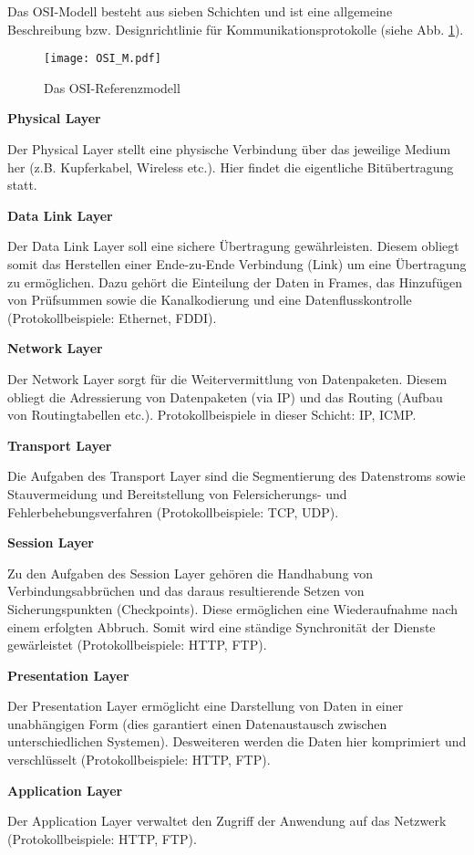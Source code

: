 Das OSI-Modell besteht aus sieben Schichten und ist eine allgemeine Beschreibung
bzw. Designrichtlinie f{\"u}r Kommunikationsprotokolle (siehe Abb.
\ref{fig:OSI_M}).

\begin{figure}[H]
\centering
\texttt{[image: OSI\_M.pdf]}
\caption{Das OSI-Referenzmodell}
\label{fig:OSI_M}
\end{figure}

\textbf{Physical Layer}

Der Physical Layer stellt eine physische Verbindung {\"u}ber das jeweilige
Medium her (z.B. Kupferkabel, Wireless etc.). Hier findet die eigentliche
Bit{\"u}bertragung statt.

\textbf{Data Link Layer}

Der Data Link Layer soll eine sichere {\"U}bertragung gew{\"a}hrleisten. Diesem
obliegt somit das Herstellen einer Ende-zu-Ende Verbindung (Link) um eine
{\"U}bertragung zu erm{\"o}glichen. Dazu geh{\"o}rt die Einteilung der Daten in
Frames, das Hinzuf{\"u}gen von Pr{\"u}fsummen sowie die Kanalkodierung und eine
Datenflusskontrolle (Protokollbeispiele: Ethernet, FDDI).

\textbf{Network Layer}

Der Network Layer sorgt f{\"u}r die Weitervermittlung von Datenpaketen. Diesem
obliegt die Adressierung von Datenpaketen (via IP) und das Routing (Aufbau von
Routingtabellen etc.). Protokollbeispiele in dieser Schicht: IP, ICMP.

\textbf{Transport Layer}

Die Aufgaben des Transport Layer sind die Segmentierung des Datenstroms sowie
Stauvermeidung und Bereitstellung von Felersicherungs- und
Fehlerbehebungsverfahren (Protokollbeispiele: TCP, UDP).

\textbf{Session Layer}

Zu den Aufgaben des Session Layer geh{\"o}ren die Handhabung von
Verbindungsabbr{\"u}chen und das daraus resultierende Setzen von
Sicherungspunkten (Checkpoints). Diese erm{\"o}glichen eine Wiederaufnahme
nach einem erfolgten Abbruch. Somit wird eine st{\"a}ndige Synchronit{\"a}t der
Dienste gew{\"a}rleistet (Protokollbeispiele: HTTP, FTP).

\textbf{Presentation Layer}

Der Presentation Layer erm{\"o}glicht eine Darstellung von Daten in
einer unabh{\"a}ngigen Form (dies garantiert einen Datenaustausch zwischen
unterschiedlichen Systemen). Desweiteren werden die Daten hier komprimiert und
verschl{\"u}sselt (Protokollbeispiele: HTTP, FTP).

\textbf{Application Layer}

Der Application Layer verwaltet den Zugriff der Anwendung auf das Netzwerk
(Protokollbeispiele: HTTP, FTP).
